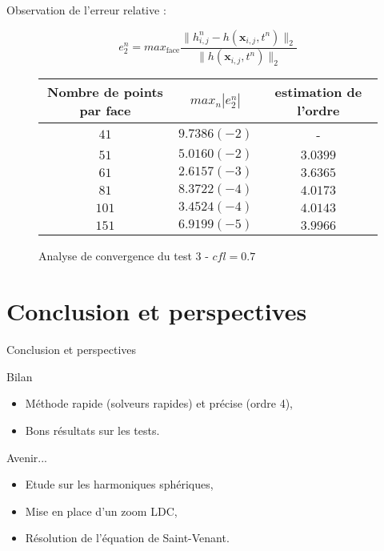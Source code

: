 \documentclass[11pt]{beamer}
\begin{document}
\begin{frame}

Observation de l'erreur relative :

$$e_2^n = max_{\text{face}} \dfrac{ \| h^n_{i,j} - h(\mathbf{x}_{i,j}, t^n ) \|_2 }{\| h(\mathbf{x}_{i,j}, t^n ) \|_2}$$

\begin{figure}
\begin{tabular}{ccc}
Nombre de points par face & $max_n |e_2^n|$ & estimation de l'ordre \\
\hline
\hline
$41$ & $9.7386 (-2)$ & - \\
\hline 
$51$ & $5.0160 (-2)$ & $3.0399$ \\
\hline
$61$ & $2.6157 (-3)$ & $3.6365$ \\
\hline
$81$ & $8.3722 (-4)$ & $4.0173$ \\
\hline
$101$ & $3.4524 (-4)$ & $4.0143$\\
\hline
$151$ & $6.9199 (-5)$ & $3.9966$
\end{tabular}
\caption{Analyse de convergence du test 3 - $cfl = 0.7$}
\end{figure}

\end{frame}


\section{Conclusion et perspectives}
\begin{frame}{Conclusion et perspectives}
\begin{block}{Bilan}
\begin{itemize}
\item Méthode rapide (solveurs rapides) et précise (ordre 4),

\item Bons résultats sur les tests.
\end{itemize}
\end{block}

\pause

\begin{block}{Avenir...}
\begin{itemize}
\item Etude sur les harmoniques sphériques,

\item Mise en place d'un zoom LDC,

\item Résolution de l'équation de Saint-Venant.
\end{itemize}
\end{block}
\end{frame}
\end{document}
